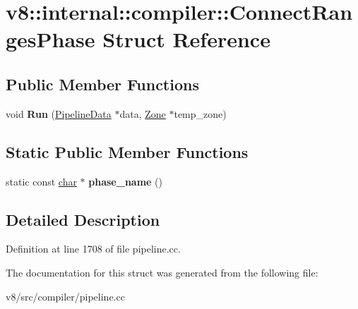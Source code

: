 \hypertarget{structv8_1_1internal_1_1compiler_1_1ConnectRangesPhase}{}\section{v8\+:\+:internal\+:\+:compiler\+:\+:Connect\+Ranges\+Phase Struct Reference}
\label{structv8_1_1internal_1_1compiler_1_1ConnectRangesPhase}
\subsection*{Public Member Functions}
\begin{DoxyCompactItemize}
\item 
\mbox{\label{structv8_1_1internal_1_1compiler_1_1ConnectRangesPhase_ac9dfc51bf2fb6550370250ac5a4822ad}} 
void {\bfseries Run} (\mbox{\hyperlink{classv8_1_1internal_1_1compiler_1_1PipelineData}{Pipeline\+Data}} $\ast$data, \mbox{\hyperlink{classv8_1_1internal_1_1Zone}{Zone}} $\ast$temp\+\_\+zone)
\end{DoxyCompactItemize}
\subsection*{Static Public Member Functions}
\begin{DoxyCompactItemize}
\item 
\mbox{\label{structv8_1_1internal_1_1compiler_1_1ConnectRangesPhase_acee78a4b072be009998481fcb2fbeb2d}} 
static const \mbox{\hyperlink{classchar}{char}} $\ast$ {\bfseries phase\+\_\+name} ()
\end{DoxyCompactItemize}


\subsection{Detailed Description}


Definition at line 1708 of file pipeline.\+cc.



The documentation for this struct was generated from the following file\+:\begin{DoxyCompactItemize}
\item 
v8/src/compiler/pipeline.\+cc\end{DoxyCompactItemize}
